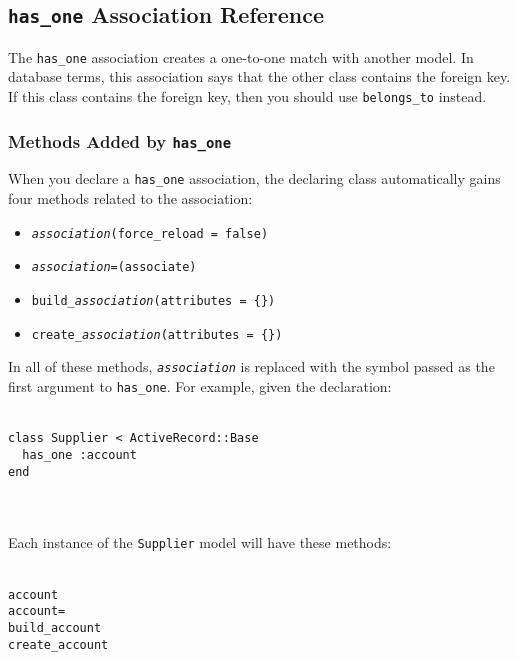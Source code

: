\documentclass[10pt]{book}
\begin{document}
\subsection{ \texttt{has\_one} Association Reference}

The \texttt{has\_one} association creates a one-to-one match with  another model. In database terms, this association says that the other  class contains the foreign key. If this class contains the foreign key,  then you should use \texttt{belongs\_to} instead.

\subsubsection{ Methods Added by \texttt{has\_one}}

When you declare a \texttt{has\_one} association, the declaring class automatically gains four methods related to the association:
\begin{itemize}
	\item \texttt{\emph{association}(force\_reload = false)}
	\item \texttt{\emph{association}=(associate)}
	\item \texttt{build\_\emph{association}(attributes = \{\})}
	\item \texttt{create\_\emph{association}(attributes = \{\})}
\end{itemize}

In all of these methods, \texttt{\emph{association}} is replaced with the symbol passed as the first argument to \texttt{has\_one}. For example, given the declaration:
\\ \\
\begin{minipage}{\textwidth}{\scriptsize
\begin{verbatim}
class Supplier < ActiveRecord::Base
  has_one :account
end
\end{verbatim}}
\end{minipage}
\\ \\

Each instance of the \texttt{Supplier} model will have these methods:
\\ \\
\begin{minipage}{\textwidth}{\scriptsize
\begin{verbatim}
account
account=
build_account
create_account
\end{verbatim}}
\end{minipage}
\\ \\
\end{document}
